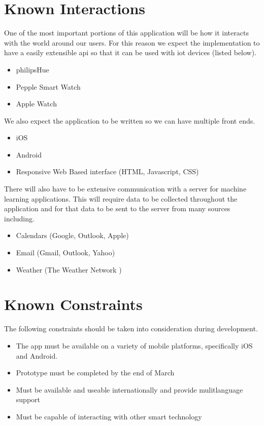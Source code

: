 \documentclass[11pt]{article}
\begin{document}
%
\section{Known Interactions}\label{known-interactions}

One of the most important portions of this application will be how it interacts with the world around our users. For this reason we expect the implementation to have a easily extensible \gls{api} so that it can be used with \gls{iot} devices (listed below).

\begin{itemize}
\item
  \gls{philipsHue}
\item
  Pepple Smart Watch
\item
  Apple Watch
\end{itemize}

We also expect the application to be written so we can have multiple front ends.
\begin{itemize}
\item
  iOS
\item
  Android
\item
  Responsive Web Based interface (HTML, Javascript, CSS)
\end{itemize}

There will also have to be extensive communication with a server for machine learning applications. This will require data to be collected throughout the application and for that data to be sent to the server from many sources including.

\begin{itemize}
\item
  Calendars (Google, Outlook, Apple)
\item
  Email (Gmail, Outlook, Yahoo)
\item
  Weather (The Weather Network \cite{theWeatherNetwork})
\end{itemize}


%
\section{Known Constraints}\label{known-constraints}

The following constraints should be taken into consideration during development.

\begin{itemize}
 \item The app must be available on a variety of mobile platforms, specifically iOS and Android.
 \item Prototype must be completed by the end of March
 \item Must be available and useable internationally and provide mulitlanguage support
 \item Must be capable of interacting with other smart technology
\end{itemize}
\end{document}
